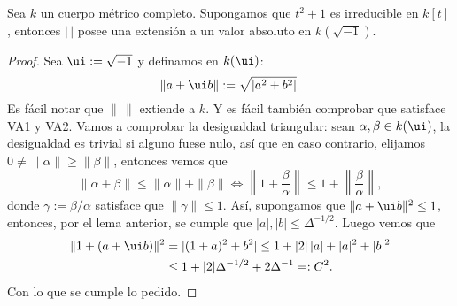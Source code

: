 \documentclass[teoria-numeros.tex]{subfiles}
\begin{document}
\begin{lem}
	Sea $k$ un cuerpo métrico completo.
	Supongamos que $t^2 + 1$ es irreducible en $k[t]$, entonces $|\,|$ posee una extensión a un valor absoluto en $k(\sqrt{-1})$.
\end{lem}
\begin{proof}
	Sea $\ui := \sqrt{-1}$ y definamos en $k(\ui)$:
	$$ \| a + \ui b \| := \sqrt{|a^2 + b^2|}. $$
	Es fácil notar que $\|\,\|$ extiende a $k$.
	Y es fácil también comprobar que satisface VA1 y VA2.
	Vamos a comprobar la desigualdad triangular: sean $\alpha, \beta \in k(\ui)$, la desigualdad es trivial si alguno fuese nulo, así que en caso contrario,
	elijamos $0 \ne \|\alpha\| \ge \|\beta\|$, entonces vemos que
	$$ \|\alpha + \beta\| \le \|\alpha\| + \|\beta\| \iff \left\| 1 + \frac{\beta}{\alpha} \right\| \le 1 + \left\| \frac{\beta}{\alpha} \right\|, $$
	donde $\gamma := \beta / \alpha$ satisface que $\|\gamma\| \le 1$.
	Así, supongamos que $\|a + \ui b\|^2 \le 1$, entonces, por el lema anterior, se cumple que $|a|, |b| \le \Delta^{-1/2}$.
	Luego vemos que
	\begin{align*}
		\|1 + (a + \ui b)\|^2 &= |(1 + a)^2 + b^2| \le 1 + |2|\,|a| + |a|^2 + |b|^2 \\
				      &\le 1 + |2| \Delta^{-1/2} + 2\Delta^{-1} =: C^2.
	\end{align*}
	Con lo que se cumple lo pedido.
\end{proof}
\end{document}
